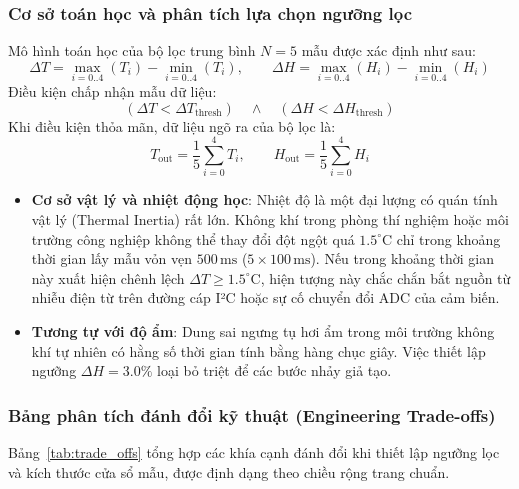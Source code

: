 \subsubsection{Cơ sở toán học và phân tích lựa chọn ngưỡng lọc}
Mô hình toán học của bộ lọc trung bình $N = 5$ mẫu được xác định như sau:
\begin{equation}
\Delta T = \max_{i=0..4}(T_i) - \min_{i=0..4}(T_i), \qquad \Delta H = \max_{i=0..4}(H_i) - \min_{i=0..4}(H_i)
\end{equation}
Điều kiện chấp nhận mẫu dữ liệu:
\begin{equation}
(\Delta T < \Delta T_{\text{thresh}}) \quad \land \quad (\Delta H < \Delta H_{\text{thresh}})
\end{equation}
Khi điều kiện thỏa mãn, dữ liệu ngõ ra của bộ lọc là:
\begin{equation}
T_{\text{out}} = \frac{1}{5}\sum_{i=0}^{4} T_i, \qquad H_{\text{out}} = \frac{1}{5}\sum_{i=0}^{4} H_i
\end{equation}

\begin{tcolorbox}[
    colback=blue!4, colframe=blue!70!black, arc=2mm,
    title=\textbf{Luận giải chuyên sâu: Lựa chọn ngưỡng $\Delta T = 1.5^\circ\text{C}$ và $\Delta H = 3.0\%$}
]
\begin{itemize}[leftmargin=*]
    \item \textbf{Cơ sở vật lý và nhiệt động học}: Nhiệt độ là một đại lượng có quán tính vật lý (Thermal Inertia) rất lớn. Không khí trong phòng thí nghiệm hoặc môi trường công nghiệp không thể thay đổi đột ngột quá $1.5^\circ\text{C}$ chỉ trong khoảng thời gian lấy mẫu vỏn vẹn $500\,\text{ms}$ ($5 \times 100\,\text{ms}$). Nếu trong khoảng thời gian này xuất hiện chênh lệch $\Delta T \ge 1.5^\circ\text{C}$, hiện tượng này chắc chắn bắt nguồn từ nhiễu điện từ trên đường cáp I²C hoặc sự cố chuyển đổi ADC của cảm biến.
    \item \textbf{Tương tự với độ ẩm}: Dung sai ngưng tụ hơi ẩm trong môi trường không khí tự nhiên có hằng số thời gian tính bằng hàng chục giây. Việc thiết lập ngưỡng $\Delta H = 3.0\%$ loại bỏ triệt để các bước nhảy giả tạo.
\end{itemize}
\end{tcolorbox}

\vspace{0.2cm}
\subsubsection{Bảng phân tích đánh đổi kỹ thuật (Engineering Trade-offs)}
Bảng~\ref{tab:trade_offs} tổng hợp các khía cạnh đánh đổi khi thiết lập ngưỡng lọc và kích thước cửa sổ mẫu, được định dạng theo chiều rộng trang chuẩn.

